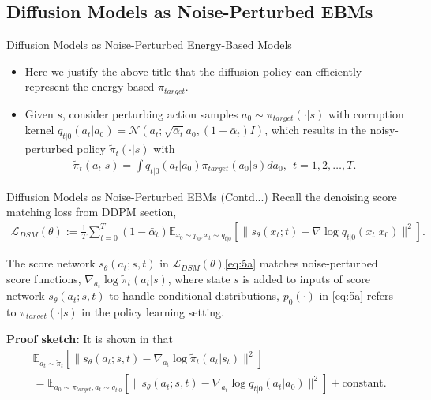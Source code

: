 \documentclass[aspectratio=169,xcolor=dvipsnames]{beamer}
\newcommand{\bE}{\mathbb{E}}
\newcommand{\cL}{\mathcal{L}}
\newcommand{\te}{\theta}
\newcommand{\nal}[1]{\begin{align*}#1\end{align*}}
\newcommand{\al}[1]{\begin{align}#1\end{align}}
\newcommand{\cN}{\mathcal{N}}
\begin{document}
\subsection{Diffusion Models as Noise-Perturbed EBMs}
\begin{frame}{Diffusion Models as Noise-Perturbed Energy-Based Models}
\begin{itemize}
    \item  Here we justify the above title that the diffusion policy can efficiently represent the energy
based $\pi_{target}$. 
 \item Given $s$, consider perturbing action samples $a_0\sim \pi_{target}(\cdot|s)$ with corruption kernel
 $q_{t|0}(a_t|a_0) = \cN(a_t;\sqrt{\bar{\alpha}_t}a_0,(1-\bar{\alpha}_t)I)$, which results in the noisy-perturbed policy $\tilde{\pi}_t(\cdot|s)$ with
 \al{
    \tilde{\pi}_t(a_t|s) = \int q_{t|0}(a_t|a_0)\pi_{target}(a_0|s)da_0, ~~t=1,2,\ldots,T. \label{eq:7}
 }
\end{itemize}
\end{frame}
\begin{frame}{Diffusion Models as Noise-Perturbed EBMs (Contd...)}
Recall the denoising score matching loss from DDPM section,
\al{
    \cL_{DSM}(\te):=\frac{1}{T}\sum\limits_{t=0}^{T}(1-\bar{\alpha}_t)\bE_{x_0\sim p_0, x_t\sim q_{t|0}}\left[\|s_{\te}(x_t;t)-\nabla\log q_{t|0}(x_t|x_0)\|^2\right]. \label{eq:5a}
 }
\begin{theorem}
        The score network $s_{\te}(a_t;s,t)$ in $\cL_{DSM}(\te)$\eqref{eq:5a} matches noise-perturbed score functions, $\nabla_{a_t}\log\tilde{\pi}_t(a_t|s)$, where state $s$ is added to inputs of score network $s_{\te}(a_t;s,t)$ to handle conditional distributions, $p_0(\cdot)$ in \eqref{eq:5a} refers to $\pi_{target}(\cdot|s)$ in the policy learning setting.
    \end{theorem}
    \textbf{Proof sketch:}
It is shown in \cite{ma2025soft} that 
\nal{
    & \bE_{a_t\sim \tilde{\pi}_t}\left[\|s_{\te}(a_t;s,t)-\nabla_{a_t}\log\tilde{\pi}_t(a_t|s_t)\|^2\right] \\
    & = \bE_{a_0\sim \pi_{target}, a_t\sim q_{t|0}}\left[\|s_{\te}(a_t;s,t)-\nabla_{a_t}\log q_{t|0}(a_t|a_0)\|^2\right] + \text{constant}.
}
\end{frame}
\end{document}
